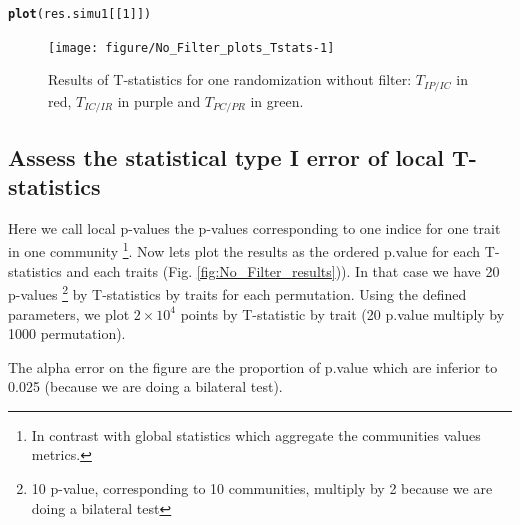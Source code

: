 \documentclass[12pt]{article}\usepackage[]{graphicx}\usepackage[]{color}
\makeatletter
\newcommand{\hlnum}[1]{\textcolor[rgb]{0.686,0.059,0.569}{#1}}%
\newcommand{\hlstd}[1]{\textcolor[rgb]{0.345,0.345,0.345}{#1}}%
\newcommand{\hlkwd}[1]{\textcolor[rgb]{0.737,0.353,0.396}{\textbf{#1}}}%
\newenvironment{kframe}{%
 \def\at@end@of@kframe{}%
 \ifinner\ifhmode%
  \def\at@end@of@kframe{\end{minipage}}%
  \begin{minipage}{\columnwidth}%
 \fi\fi%
 \def\FrameCommand##1{\hskip\@totalleftmargin \hskip-\fboxsep
 \colorbox{shadecolor}{##1}\hskip-\fboxsep
     \hskip-\linewidth \hskip-\@totalleftmargin \hskip\columnwidth}%
 \MakeFramed {\advance\hsize-\width
   \@totalleftmargin\z@ \linewidth\hsize
   \@setminipage}}%
 {\par\unskip\endMakeFramed%
 \at@end@of@kframe}
\newenvironment{knitrout}{}{} %
\makeatother
\begin{document}
\begin{knitrout}\small
{}\color{fgcolor}\begin{kframe}
\begin{alltt}
\hlkwd{plot}\hlstd{(res.simu1[[}\hlnum{1}\hlstd{]])}
\end{alltt}
\end{kframe}\begin{figure}

{\centering \texttt{[image: figure/No\_Filter\_plots\_Tstats-1]} 

}

\caption[Results of T-statistics for one randomization without filter]{Results of T-statistics for one randomization without filter: $T_{IP/IC}$ in red, $T_{IC/IR}$ in purple and $T_{PC/PR}$ in green.\label{fig:No_Filter_plots_Tstats}}
\end{figure}


\end{knitrout}

 \subsection {Assess the statistical type I error of local T-statistics}
 
Here we call local p-values the p-values corresponding to one indice for one trait in one community \footnote{In contrast with global statistics which aggregate the communities values metrics.}. Now lets plot the results as the ordered p.value for each T-statistics and each traits (Fig. \ref{fig:No_Filter_results})). In that case we have 20 p-values \footnote{10 p-value, corresponding to 10 communities, multiply by 2 because we are doing a bilateral test} by T-statistics by traits for each permutation. Using the defined parameters, we plot \ensuremath{2\times 10^{4}} points by T-statistic by trait (20 p.value multiply by 1000 permutation). 

The alpha error on the figure are the proportion of p.value which are inferior to 0.025 (because we are doing a bilateral test).
\end{document}
